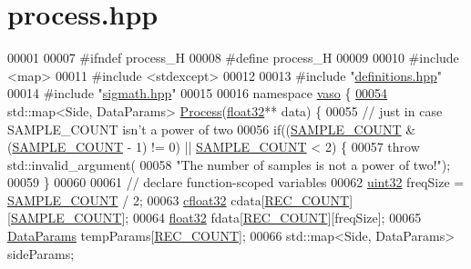 \hypertarget{process_8hpp_source}{\section{process.\+hpp}
\label{process_8hpp_source}
}

\begin{DoxyCode}
00001 
00007 \textcolor{preprocessor}{#ifndef process\_H}
00008 \textcolor{preprocessor}{#define process\_H}
00009 
00010 \textcolor{preprocessor}{#include <map>}
00011 \textcolor{preprocessor}{#include <stdexcept>}
00012 
00013 \textcolor{preprocessor}{#include "\hyperlink{definitions_8hpp}{definitions.hpp}"}
00014 \textcolor{preprocessor}{#include "\hyperlink{sigmath_8hpp}{sigmath.hpp}"}
00015 
00016 \textcolor{keyword}{namespace }\hyperlink{namespacevaso}{vaso} \{    
\hypertarget{process_8hpp_source_l00054}{}\hyperlink{namespacevaso_a0a7aa548b31b50c92be5b08bcb1df9a0}{00054}     std::map<Side, DataParams> \hyperlink{namespacevaso_a0a7aa548b31b50c92be5b08bcb1df9a0}{Process}(\hyperlink{definitions_8hpp_aacdc525d6f7bddb3ae95d5c311bd06a1}{float32}** data) \{
00055         \textcolor{comment}{// just in case SAMPLE\_COUNT isn't a power of two}
00056         \textcolor{keywordflow}{if}((\hyperlink{definitions_8hpp_a1682c770d91c5d167b621a782be940d4}{SAMPLE\_COUNT} & (\hyperlink{definitions_8hpp_a1682c770d91c5d167b621a782be940d4}{SAMPLE\_COUNT} - 1) != 0) || 
      \hyperlink{definitions_8hpp_a1682c770d91c5d167b621a782be940d4}{SAMPLE\_COUNT} < 2) \{
00057             \textcolor{keywordflow}{throw} std::invalid\_argument(
00058                     \textcolor{stringliteral}{"The number of samples is not a power of two!"});
00059         \}
00060 
00061         \textcolor{comment}{// declare function-scoped variables}
00062         \hyperlink{definitions_8hpp_a1134b580f8da4de94ca6b1de4d37975e}{uint32} freqSize = \hyperlink{definitions_8hpp_a1682c770d91c5d167b621a782be940d4}{SAMPLE\_COUNT} / 2;
00063         \hyperlink{definitions_8hpp_a960be6b6614c08090c16574dba10a421}{cfloat32} cdata[\hyperlink{definitions_8hpp_aa44e6143be9e89f19be973956c22e134}{REC\_COUNT}][\hyperlink{definitions_8hpp_a1682c770d91c5d167b621a782be940d4}{SAMPLE\_COUNT}];
00064         \hyperlink{definitions_8hpp_aacdc525d6f7bddb3ae95d5c311bd06a1}{float32} fdata[\hyperlink{definitions_8hpp_aa44e6143be9e89f19be973956c22e134}{REC\_COUNT}][freqSize];
00065         \hyperlink{structDataParams}{DataParams} tempParams[\hyperlink{definitions_8hpp_aa44e6143be9e89f19be973956c22e134}{REC\_COUNT}];
00066         std::map<Side, DataParams> sideParams;

\end{DoxyCode}
